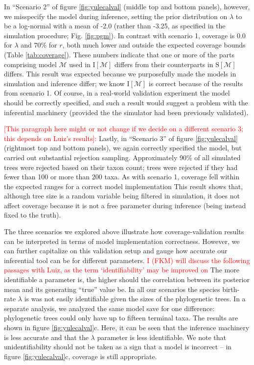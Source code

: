 \documentclass[oneside]{article}
\begin{document}
In ``Scenario 2'' of figure \ref{fig:yulecalval} (middle top and bottom panels), however, we misspecify the model during inference, setting the prior distribution on $\lambda$ to be a log-normal with a mean of -2.0 (rather than -3.25, as specified in the simulation procedure; Fig. \ref{fig:pgm}).
In contrast with scenario 1, coverage is 0.0 for $\lambda$ and 70\% for $r$, both much lower and outside the expected coverage bounds (Table \ref{tab:coverage}).
These numbers indicate that one or more of the parts comprising model $\mathcal{M}$ used in $\text{I}[\mathcal{M}]$ differs from their counterparts in $\text{S}[\mathcal{M}]$ differs.
This result was expected because we purposefully made the models in simulation and inference differ; we know $\text{I}[\mathcal{M}]$ is correct because of the results from scenario 1.
Of course, in a real-world validation experiment the model should be correctly specified, and such a result would suggest a problem with the inferential machinery (provided the the simulator had been previously validated).

\textcolor{red}{[This paragraph here might or not change if we decide on a different scenario 3; this depends on Luiz's results]:}
Lastly, in ``Scenario 3'' of figure \ref{fig:yulecalval} (rightmost top and bottom panels), we again correctly specified the model, but carried out substantial rejection sampling.
Approximately 90\% of all simulated trees were rejected based on their taxon count; trees were rejected if they had fewer than 100 or more than 200 taxa.
As with scenario 1, coverage fell within the expected ranges for a correct model implementation
This result shows that, although tree size is a random variable being filtered in simulation, it does not affect coverage because it is not a free parameter during inference (being instead fixed to the truth).

The three scenarios we explored above illustrate how
coverage-validation results can be interpreted in terms of model
implementation correctness.
However, we can further capitalize on this validation setup and
gauge how accurate our inferential tool can be for different
parameters. 
\textcolor{red}{I (FKM) will discuss the following passages with Luiz, as
the term `identifiability' may be improved on}
The more identifiable a parameter is, the higher should the
correlation between its posterior mean and its generating ``true''
value be.
In all our scenarios the species birth-rate $\lambda$ is was not easily identifiable given the sizes of the phylogenetic trees.
In a separate analysis, we analyzed the same model save for one
difference: phylogenetic trees could only have up to fifteen
terminal taxa.
The results are shown in figure \ref{fig:yulecalval}c.
Here, it can be seen that the inference machinery is less accurate
and that the $\lambda$ parameter is less identifiable.
We note that unidentifiability should not be taken as a sign that
a model is incorrect -- in figure \ref{fig:yulecalval}c, coverage
is still appropriate.
\end{document}
